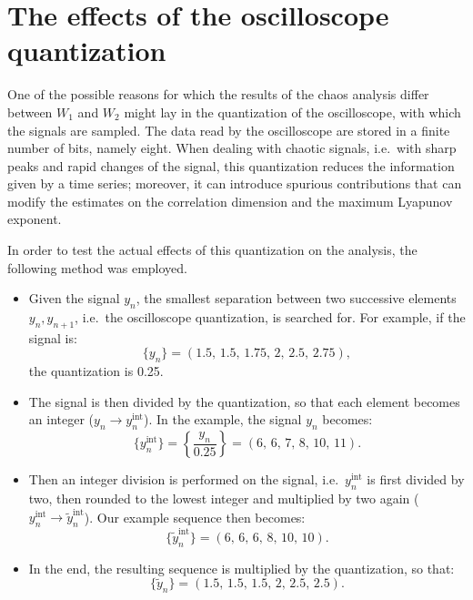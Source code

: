 \section{The effects of the oscilloscope quantization}\label{sec: oscilloscope quantization}
One of the possible reasons for which the results of the chaos analysis differ between $W_1$ and $W_2$
might lay in the quantization of the oscilloscope, with which the signals are sampled.
The data read by the oscilloscope are stored in a finite number of bits, namely eight.
When dealing with chaotic signals, i.e.\ with sharp peaks and rapid changes of the signal,
this quantization reduces the information given by a time series; moreover, it can introduce
spurious contributions that can modify the estimates on the correlation dimension and the maximum
Lyapunov exponent.

In order to test the actual effects of this quantization on the analysis, the following method was
employed.
\begin{itemize}
    \item
    Given the signal $y_n$, the smallest separation between two successive elements
    $y_n,y_{n+1}$, i.e.\ the oscilloscope quantization, is searched for.
    For example, if the signal is:
    \begin{equation*}
        \{y_n\}=(1.5,\,1.5,\,1.75,\,2,\,2.5,\,2.75),
    \end{equation*}
    the quantization is 0.25.

    \item
    The signal is then divided by the quantization, so that each element becomes an integer
    ($y_n\rightarrow y_n^{\text{int}}$).
    In the example, the signal $y_n$ becomes:
    \begin{equation*}
        \{y_n^{\text{int}}\}=\left\{\frac{y_n}{0.25}\right\}=(6,\,6,\,7,\,8,\,10,\,11).
    \end{equation*}

    \item
    Then an integer division is performed on the signal, i.e.\ $y_n^{\text{int}}$ is first divided
    by two, then rounded to the lowest integer and multiplied by two again
    ($y_n^{\text{int}}\rightarrow \tilde{y}_n^{\text{int}}$).
    Our example sequence then becomes:
    \begin{equation*}
        \{\tilde{y}_n^{\text{int}}\}=(6,\,6,\,6,\,8,\,10,\,10).
    \end{equation*}

    \item
    In the end, the resulting sequence is multiplied by the quantization, so that:
    \begin{equation*}
        \{\tilde{y}_n\}=(1.5,\,1.5,\,1.5,\,2,\,2.5,\,2.5).
    \end{equation*}
\end{itemize}

